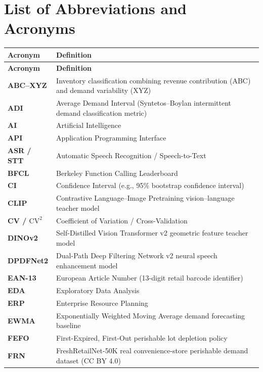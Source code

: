 \chapter*{List of Abbreviations and Acronyms}

\begin{longtable}{|L{3.4cm}|L{11.1cm}|}
\hline
\textbf{Acronym} & \textbf{Definition} \\
\hline
\endfirsthead
\hline
\textbf{Acronym} & \textbf{Definition} \\
\hline
\endhead
\hline
\endfoot
\textbf{ABC--XYZ} & Inventory classification combining revenue contribution (ABC) and demand variability (XYZ) \\
\hline
\textbf{ADI} & Average Demand Interval (Syntetos--Boylan intermittent demand classification metric) \\
\hline
\textbf{AI} & Artificial Intelligence \\
\hline
\textbf{API} & Application Programming Interface \\
\hline
\textbf{ASR / STT} & Automatic Speech Recognition / Speech-to-Text \\
\hline
\textbf{BFCL} & Berkeley Function Calling Leaderboard \\
\hline
\textbf{CI} & Confidence Interval (e.g., 95\% bootstrap confidence interval) \\
\hline
\textbf{CLIP} & Contrastive Language--Image Pretraining vision--language teacher model \\
\hline
\textbf{CV / $\text{CV}^2$} & Coefficient of Variation / Cross-Validation \\
\hline
\textbf{DINOv2} & Self-Distilled Vision Transformer v2 geometric feature teacher model \\
\hline
\textbf{DPDFNet2} & Dual-Path Deep Filtering Network v2 neural speech enhancement model \\
\hline
\textbf{EAN-13} & European Article Number (13-digit retail barcode identifier) \\
\hline
\textbf{EDA} & Exploratory Data Analysis \\
\hline
\textbf{ERP} & Enterprise Resource Planning \\
\hline
\textbf{EWMA} & Exponentially Weighted Moving Average demand forecasting baseline \\
\hline
\textbf{FEFO} & First-Expired, First-Out perishable lot depletion policy \\
\hline
\textbf{FRN} & FreshRetailNet-50K real convenience-store perishable demand dataset (CC BY 4.0) \\

\end{longtable}
